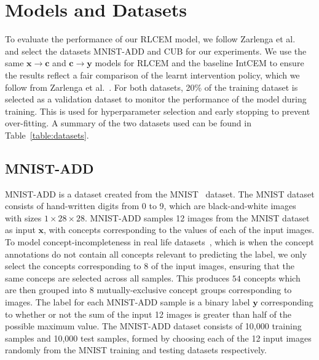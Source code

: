\section{Models and Datasets}\label{method:datasets}
To evaluate the performance of our RLCEM model,
we follow Zarlenga et al.~\cite{intcem} and select the datasets MNIST-ADD and CUB for 
our experiments. 
We use the same $\mathbf{x} \to \mathbf{c}$
and $\mathbf{c} \to \mathbf{y}$ models
for RLCEM and the baseline IntCEM to ensure the results reflect a fair comparison 
of the learnt intervention policy, which we follow from Zarlenga et al.~\cite{intcem}.
For both datasets, 20\% of the training dataset is selected
as a validation dataset to monitor
the performance of the model during training. This is used for hyperparameter
selection and early stopping to prevent over-fitting. A summary of the two
datasets used can be found in Table~\ref{table:datasets}.

\subsection{MNIST-ADD}
MNIST-ADD is a dataset created from 
the MNIST~\cite{mnist} dataset. 
The MNIST dataset consists of hand-written digits from 0 to 9,
which are black-and-white images with sizes $1 \times 28 \times 28$.
MNIST-ADD samples
12 images from the MNIST dataset as input $\mathbf{x}$,
with concepts corresponding to the values of each of the input images.
To model concept-incompleteness in real life datasets~\cite{cem},
which is when the 
concept annotations do not contain all
concepts relevant to predicting the label, we only select the concepts corresponding to 8
of the input images, ensuring that the same conceps are selected across
all samples. This produces $54$ concepts which are then grouped into 8 
mutually-exclusive concept groups corresponding to images.
The label for each MNIST-ADD sample
is a binary label $\mathbf{y}$ corresponding to whether or not the sum of the input
12 images is greater than half of the possible maximum value.
The MNIST-ADD dataset consists of 
 10,000 training samples and 10,000 test samples, formed by choosing
each of the 12 input images randomly from the MNIST training and testing
datasets respectively.

